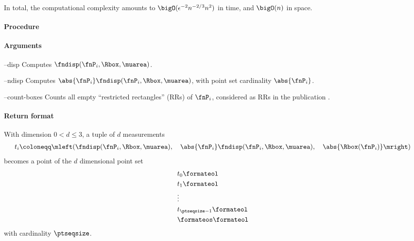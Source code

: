 In total, the computational complexity amounts to $\bigO(\epsilon^{-2} n^{-2/3} n^2)$ in time, and $\bigO(n)$ in space.

\paragraph{Procedure}

\begin{synopsis}
\end{synopsis}

\paragraph{Arguments}

\begin{procarg}{--disp}
  Computes $\fndisp(\fnP_i, \Rbox, \muarea)$.
\end{procarg}

\begin{procarg}{--ndisp}
  Computes $\abs{\fnP_i} \fndisp(\fnP_i, \Rbox, \muarea)$, with point set cardinality $\abs{\fnP_i}$.
\end{procarg}

\begin{procarg}{--count-boxes}
  Counts all empty \enquote{restricted rectangles} (RRs) of $\fnP_i$, considered as RRs in the publication .
\end{procarg}

\procarginseq{\ptseqsize}

\procargout

\procargsilent

\paragraph{Return format}

With dimension $0 < d \leq 3$, a tuple of $d$ measurements
\begin{align*}
  t_i \coloneqq \mleft( \fndisp(\fnP_i, \Rbox, \muarea),\quad \abs{\fnP_i} \fndisp(\fnP_i, \Rbox, \muarea),\quad \abs{\Rbox(\fnP_i)} \mright)
\end{align*}
becomes a point of the $d$ dimensional point set
\begin{align*}
  &t_0\formateol\\
  &t_1\formateol\\
  &\vdots \\
  &t_{\ptseqsize-1}\formateol\\
  &\formateos\formateol
\end{align*}
with cardinality $\ptseqsize$.
